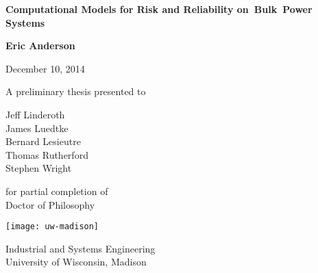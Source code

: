 \begin{titlepage}
    \begin{center}
        \vspace*{2cm}
        
{\LARGE        \textbf{Computational Models for Risk and Reliability on~Bulk~Power Systems}}
                
        \vspace{1.5cm}
        
        \textbf{Eric Anderson}

        \vspace{.2cm}

        December 10, 2014

        \vfill
        
        A preliminary thesis presented to

        \vspace{.25cm}

        Jeff Linderoth\\
        James Luedtke\\
        Bernard Lesieutre \\
        Thomas Rutherford\\
        Stephen Wright

        \vspace{.45cm}

        for partial completion of\\
        Doctor of Philosophy\\
        
        \vspace{0.3cm}
        
        \texttt{[image: uw-madison]}
       
        Industrial and Systems Engineering\\        
        University of Wisconsin, Madison\\
        
        \vspace{1.5cm}

        
    \end{center}
\end{titlepage}
